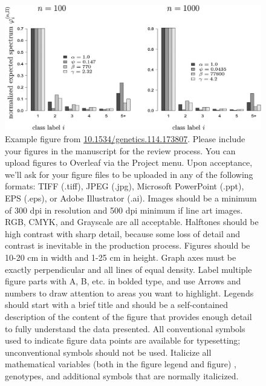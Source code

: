 \documentclass[9pt,twocolumn,twoside]{gsajnl}
\begin{document}
\begin{figure}[htbp]
\centering
\includegraphics[width=\linewidth]{example-figure}
\caption{Example figure from \url{10.1534/genetics.114.173807}. Please include your figures in the manuscript for the review process. You can upload figures to Overleaf via the Project menu. Upon acceptance, we'll ask for your figure files to be uploaded in any of the following formats: TIFF (.tiff), JPEG (.jpg), Microsoft PowerPoint (.ppt), EPS (.eps), or Adobe Illustrator (.ai).  Images should be a minimum of 300 dpi in resolution and 500 dpi minimum if line art images.  RGB, CMYK, and Grayscale are all acceptable. Halftones should be high contrast with sharp detail, because some loss of detail and contrast is inevitable in the production process. Figures should be 10-20 cm in width and 1-25 cm in height. Graph axes must be exactly perpendicular and all lines of equal density.
Label multiple figure parts with A, B, etc. in bolded type, and use Arrows and numbers to draw attention to areas you want to highlight. Legends should start with a brief title and should be a self-contained description of the content of the figure that provides enough detail to fully understand the data presented. All conventional symbols used to indicate figure data points are available for typesetting; unconventional symbols should not be used. Italicize all mathematical variables (both in the figure legend and figure) , genotypes, and additional symbols that are normally italicized.  
}%
\label{fig:spectrum}
\end{figure}
\end{document}
